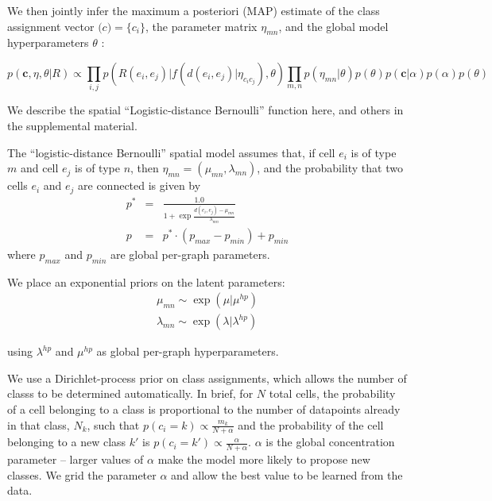 \documentclass{article}
\renewcommand{\vec}[1]{\mathbf{#1}}
\begin{document}
We then jointly infer the maximum a posteriori (MAP) estimate of the
class assignment vector $\vec(c) = \{c_i\}$, the parameter matrix $\eta_{mn}$, and
the global model hyperparameters $\theta$ :

\begin{equation}
  p(\vec{c}, \eta, \theta | R ) \propto \prod_{i, j} p(R(e_i, e_j) | f(d(e_i, e_j) | \eta_{c_ic_j}), \theta) \prod_{m, n} p(\eta_{mn} | \theta)  p(\theta) p(\vec{c} | \alpha) p(\alpha) p(\theta)
\end{equation}





We describe the spatial ``Logistic-distance Bernoulli''  function here,
and others in the supplemental material. 

The ``logistic-distance Bernoulli'' spatial model assumes that, if cell
$e_i$ is of type $m$ and cell $e_j$ is of type $n$, then $\eta_{mn}
= (\mu_{mn}, \lambda_{mn})$, and the probability that two cells $e_i$
and $e_j$ are connected is given by
\begin{eqnarray}
p^* &=& \frac{1.0}{1 + \exp \frac{d(e_i, e_j) - \mu_{mn}}{\lambda_{mn}}}\\
p &= & p^* \cdot (p_{max} - p_{min}) + p_{min}
\end{eqnarray}
where $p_{max}$ and $p_{min}$ are global per-graph parameters. 

We place an exponential priors on the latent parameters:
\begin{eqnarray}
 \mu_{mn} \sim \exp(\mu | \mu^{hp}) \\
\lambda_{mn} \sim \exp(\lambda | \lambda^{hp})
\end{eqnarray}

using  $\lambda^{hp}$ and $\mu^{hp}$ as global per-graph hyperparameters. 

We use a Dirichlet-process prior on class assignments, which allows
the number of classs to be determined automatically. In brief, for $N$
total cells, the probability of a cell belonging to a class is
proportional to the number of datapoints already in that class, $N_k$,
such that $p(c_i = k) \propto \frac{m_k}{N + \alpha}$ and the
probability of the cell belonging to a new class $k'$ is $p(c_i = k')
\propto \frac{\alpha}{N + \alpha}$. $\alpha$ is the global
concentration parameter -- larger values of $\alpha$ make the model
more likely to propose new classes. We grid the parameter $\alpha$ and
allow the best value to be learned from the data.
\end{document}
